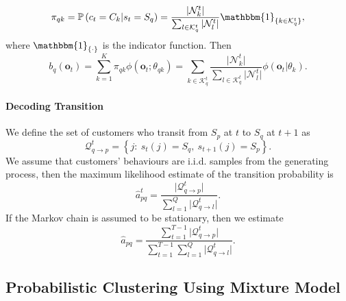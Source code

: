 \begin{equation}
\pi_{qk} = \mathbb{P} \left( c_t = C_k | s_t = S_q \right) = \frac{\vert \mathcal{N}_k^t \vert}{\sum_{l \in \mathcal{K}_q^t} \vert \mathcal{N}_l^t \vert} \mathbbm{1}_{\{ k \in \mathcal{K}_q^t \}},
\end{equation}
where $\mathbbm{1}_{\{\cdot\}}$ is the indicator function. Then
\begin{equation}
b_q (\mathbf{o}_t) = \sum_{k=1}^K \pi_{qk} \phi(\mathbf{o}_t ; \theta_{qk}) = \sum_{ k \in \mathcal{K}_q^t } \frac{\vert \mathcal{N}_k^t \vert}{\sum_{l \in \mathcal{K}_q^t} \vert \mathcal{N}_l^t \vert} \phi(\mathbf{o}_t | \theta_{k}).
\end{equation}

\paragraph*{Decoding Transition}

We define the set of customers who transit from $S_p$ at $t$ to $S_q$ at $t+1$ as
\begin{equation}
\mathcal{Q}_{q \rightarrow p}^t = \left\lbrace j: ~s_t(j) = S_q, ~s_{t+1}(j) = S_p \right\rbrace.
\end{equation}
We assume that customers' behaviours are i.i.d. samples from the generating process, then the maximum likelihood estimate of the transition probability is
\begin{equation}
\hat{a}^t_{pq} = \frac{\vert \mathcal{Q}_{q \rightarrow p}^t \vert}{\sum_{l=1}^Q \vert \mathcal{Q}_{q \rightarrow l}^t \vert}.
\end{equation}
If the Markov chain is assumed to be stationary, then we estimate
\begin{equation}
\hat{a}_{pq} = \frac{\sum_{t=1}^{T-1} \vert \mathcal{Q}_{q \rightarrow p}^t \vert}{\sum_{t=1}^{T-1} \sum_{l=1}^Q \vert \mathcal{Q}_{q \rightarrow l}^t \vert}.
\label{eq:transition}
\end{equation}

\subsection{Probabilistic Clustering Using Mixture Model}
\label{sec:mixtureModel}

